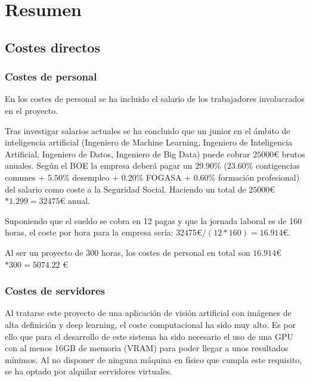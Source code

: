 \section{Resumen}\label{sec:resumencostes}


\subsection{Costes directos}\label{sec:costesdirectos}

\subsubsection{Costes de personal}\label{subsec:personal}

En los costes de personal se ha incluido el salario de los trabajadores involucrados en el proyecto. 

Tras investigar salarios actuales se ha concluido que un junior en el ámbito de inteligencia artificial (Ingeniero de Machine Learning, Ingeniero de Inteligencia Artificial, Ingeniero de Datos, Ingeniero de Big Data) puede cobrar $25000 $€$ $ brutos anuales. Según el BOE \cite{BOE} la empresa deberá pagar un $29.90\%$ ($23.60\%$ contigencias comunes + $5.50\%$ desempleo + $0.20\%$ FOGASA + $0.60\%$ formación profesional) del salario como coste a la Seguridad Social. Haciendo un total de $25000 $€$ * 1.299 = 32475 $€ anual.

Suponiendo que el sueldo se cobra en 12 pagas y que la jornada laboral es de 160 horas, el coste por hora para la empresa sería: $32475 $€$ / (12 * 160) = 16.914$€.

Al ser un proyecto de 300 horas, los costes de personal en total son $16.914 $€$ * 300 = 5074.22 $ €

\subsubsection{Costes de servidores}\label{subsec:servidores}

Al tratarse este proyecto de una aplicación de visión artificial con imágenes de alta definición y deep learning, el coste computacional ha sido muy alto. Es por ello que para el desarrollo de este sistema ha sido necesario el uso de una GPU con al menos 16GB de memoria (VRAM) para poder llegar a unos resultados mínimos. Al no disponer de ninguna máquina en físico que cumpla este requisito, se ha optado por alquilar servidores virtuales.

